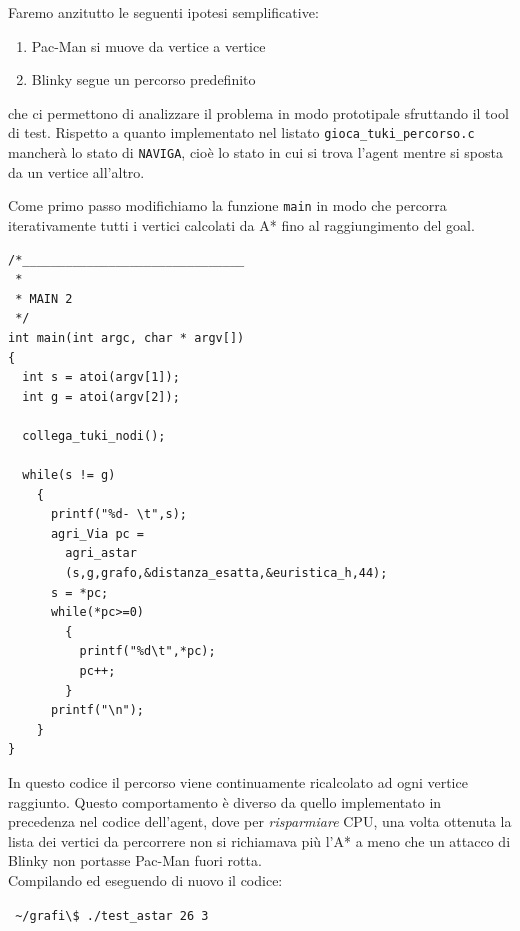 \documentclass[8pt]{book}
\begin{document}
Faremo anzitutto le seguenti ipotesi semplificative:

\begin{enumerate}
\item
  Pac-Man si muove da vertice a vertice
\item
  Blinky segue un percorso predefinito
\end{enumerate}

che ci permettono di analizzare il problema in modo prototipale sfruttando il tool di test. Rispetto a quanto implementato nel listato \texttt{gioca\_tuki\_percorso.c} mancherà lo stato di \texttt{NAVIGA}, cioè lo stato in cui si trova l'agent mentre si sposta da un vertice all'altro.

Come primo passo modifichiamo la funzione \texttt{main} in modo che percorra iterativamente tutti i vertici calcolati da A* fino al raggiungimento del goal.

\begin{spacing}{0.9}
  \begin{small}
    \begin{tcolorbox}
\begin{verbatim}
/*_______________________________
 * 
 * MAIN 2
 */
int main(int argc, char * argv[])
{
  int s = atoi(argv[1]);
  int g = atoi(argv[2]);
  
  collega_tuki_nodi();
  
  while(s != g)
    {
      printf("%d- \t",s);
      agri_Via pc = 
        agri_astar
        (s,g,grafo,&distanza_esatta,&euristica_h,44);
      s = *pc;
      while(*pc>=0)
        {
          printf("%d\t",*pc);
          pc++;
        }
      printf("\n");
    }
}
\end{verbatim}
  \end{tcolorbox}
    \end{small}
      \end{spacing}

In questo codice il percorso viene continuamente ricalcolato ad ogni vertice raggiunto. Questo comportamento è diverso da quello implementato in precedenza nel codice dell'agent, dove per \emph{risparmiare} CPU, una volta ottenuta la lista dei vertici da percorrere non si richiamava più l'A* a meno che un attacco di Blinky non portasse Pac-Man fuori rotta.\\

Compilando ed eseguendo di nuovo il codice:

\texttt{
  \newline
  \textasciitilde{}/grafi\textbackslash{}\$ ./test\_astar 26 3
  }\\
\end{document}
